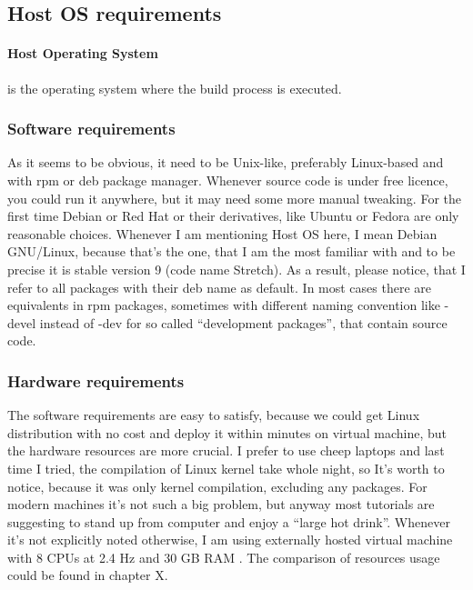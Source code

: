 \documentclass[printmode]{mgr}
\begin{document}
\subsection{Host OS requirements}

\paragraph{Host Operating System} is the operating system where the build process is executed.

\subsubsection{Software requirements}
As it seems to be obvious, it need to be Unix-like, preferably Linux-based and with rpm or deb package manager. Whenever source code is under free licence, you could run it anywhere, but it may need some more manual tweaking. For the first time Debian or Red Hat or their derivatives, like Ubuntu or Fedora are only reasonable choices. Whenever I am mentioning Host OS here, I mean Debian GNU/Linux, because that's the one, that I am the most familiar with and to be precise it is stable version 9 (code name Stretch). As a result, please notice, that I refer to all packages with their deb name as default. In most cases there are equivalents in rpm packages, sometimes with different naming convention like -devel instead of -dev for so called ``development packages'', that contain source code. \\

\subsubsection{Hardware requirements}
The software requirements are easy to satisfy, because we could get Linux distribution with no cost and deploy it within minutes on virtual machine, but the hardware resources are more crucial. I prefer to use cheep laptops and last time I tried, the compilation of Linux kernel take whole night, so It's worth to notice, because it was only kernel compilation, excluding any packages. For modern machines it's not such a big problem, but anyway most tutorials are suggesting to stand up from computer and enjoy a ``large hot drink''. Whenever it's not explicitly noted otherwise, I am using externally hosted virtual machine with 8 CPUs at 2.4 Hz and 30 GB RAM . The comparison of resources usage could be found in chapter X. %
\end{document}
